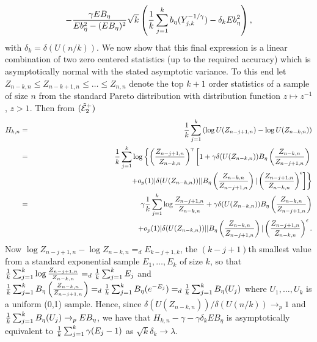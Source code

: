 \begin{subappendices}
\begin{eqnarray*}
-
\dfrac{\gamma EB_\eta }{E b^2_{\eta}-(EB_\eta)^2 }\sqrt{k} \left( {1 \over k}\sum_{j=1}^k b_\eta (Y_{j,k}^{-1/\gamma})
- \delta_k E b^2_{\eta}
\right),
\end{eqnarray*}
with $\delta_k = \delta (U(n/k))$.
We now show that this final expression is a linear combination of two zero centered statistics (up to the required accuracy) which is asymptotically normal with the stated asymptotic variance. To this end let $Z_{n-k,n} \leq Z_{n-k+1,n} \leq \ldots \leq Z_{n,n}$ denote the top $k+1$ order statistics of a sample of size $n$ from the standard Pareto distribution with distribution function $z \mapsto z^{-1}$, $z>1$. Then from $({\tilde{\cal{E}}}_2^+) $
\begin{eqnarray*}
H_{k,n} &=& {1 \over k}\sum_{j=1}^k
\left(\log U(Z_{n-j+1,n})- \log U(Z_{n-k,n}) \right) \\
&=& {1 \over k}\sum_{j=1}^k \log \left\{
\left({Z_{n-j+1,n}\over Z_{n-k,n}}\right)^\gamma 
\left[
1+\gamma \delta (U(Z_{n-k,n}))B_\eta \left( {Z_{n-k,n} \over Z_{n-j+1,n}}\right) \right. \right. \\
&& \hspace{4.6cm}\left.\left.
+o_p(1)|\delta (U(Z_{n-k,n}))| |B_\eta \left( {Z_{n-k,n} \over Z_{n-j+1,n}}\right)| \left({Z_{n-j+1,n}\over Z_{n-k,n}}\right)^\epsilon 
\right]
\right\}\\
&=& \gamma {1 \over k}\sum_{j=1}^k \log {Z_{n-j+1,n}\over Z_{n-k,n}}
+ \gamma \delta (U(Z_{n-k,n}))B_\eta \left( {Z_{n-k,n} \over Z_{n-j+1,n}}\right)\\
&& \hspace{3.5cm}
+o_p(1)|\delta (U(Z_{n-k,n}))| |B_\eta \left( {Z_{n-k,n} \over Z_{n-j+1,n}}\right)| \left({Z_{n-j+1,n}\over Z_{n-k,n}}\right)^\epsilon. 
\end{eqnarray*}
Now $\log Z_{n-j+1,n}-\log Z_{n-k,n} =_d E_{k-j+1,k}$, the $(k-j+1)$th smallest value from a standard exponential sample $E_1,\ldots,E_k$ of size $k$, so that ${1 \over k}\sum_{j=1}^k \log {Z_{n-j+1,n}\over Z_{n-k,n}}=_d {1 \over k}\sum_{j=1}^k E_j$ and ${1 \over k}\sum_{j=1}^k B_\eta \left( {Z_{n-k,n} \over Z_{n-j+1,n}}\right) =_d {1 \over k}\sum_{j=1}^k B_\eta (e^{-E_j})=_d {1 \over k}\sum_{j=1}^k B_\eta (U_j)$ where $U_1,\ldots,U_k$ is a uniform (0,1) sample. Hence, since $\delta (U(Z_{n-k,n})) / \delta (U(n/k)) \to_p 1$ and ${1 \over k}\sum_{j=1}^k B_\eta (U_j) \to_p EB_{\eta}$, we have that $H_{k,n} -\gamma - \gamma \delta_k EB_\eta$ is asymptotically equivalent to $ {1 \over k}\sum_{j=1}^k \gamma (E_j-1)$ as $\sqrt{k} \delta_k \to \lambda$. \\

\end{subappendices}
